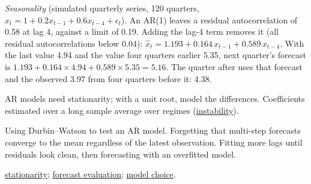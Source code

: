 \begin{qfmethod}
\emph{Seasonality} (simulated quarterly series, 120 quarters, $x_t=1+0.2x_{t-1}+0.6x_{t-4}+\epsilon_t$). An AR(1) leaves a residual autocorrelation of 0.58 at lag 4, against a limit of 0.19. Adding the lag-4 term removes it (all residual autocorrelations below 0.04): $\hat x_t=1.193+0.164\,x_{t-1}+0.589\,x_{t-4}$. With the last value 4.94 and the value four quarters earlier 5.35, next quarter's forecast is $1.193+0.164\times4.94+0.589\times5.35=5.16$. The quarter after uses that forecast and the observed 3.97 from four quarters before it: 4.38.

 AR models need stationarity; with a unit root, model the differences. Coefficients estimated over a long sample average over regimes (\hyperref[meth:forecast-accuracy-evaluation]{instability}).

 Using Durbin--Watson to test an AR model. Forgetting that multi-step forecasts converge to the mean regardless of the latest observation. Fitting more lags until residuals look clean, then forecasting with an overfitted model.

 \hyperref[def:stationarity-unit-roots]{stationarity}; \hyperref[meth:forecast-accuracy-evaluation]{forecast evaluation}; \hyperref[meth:time-series-model-selection]{model choice}.

\end{qfmethod}

